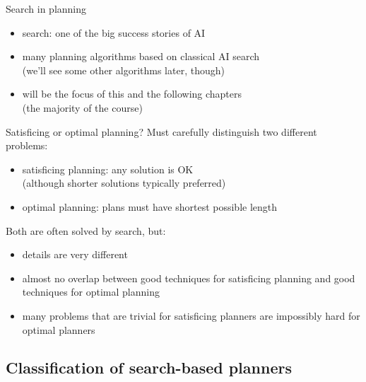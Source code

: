 \documentclass{gkibeamer}
\begin{document}
\begin{frame}{Search in planning}
  \begin{itemize}
  \item \alert{search:} one of the \alert{big success stories} of AI
  \item many planning algorithms based on classical AI search \\
    (we'll see some other algorithms later, though)
  \item will be the focus of this and the following chapters \\
    (the majority of the course)
  \end{itemize}
\end{frame}

\begin{frame}{Satisficing or optimal planning?}
  Must carefully distinguish two different problems:
  \begin{itemize}
  \item \alert{satisficing planning:} any solution is OK \\
    (although shorter solutions typically preferred)
  \item \alert{optimal planning:} plans must have shortest possible
    length
  \end{itemize}
  
  \bigskip

  Both are often solved by search, but:
  \begin{itemize}
  \item details are \alert{very different}
  \item almost \alert{no overlap} between good techniques for
    satisficing planning and good techniques for optimal planning
  \item many problems that are trivial for satisficing planners
    are impossibly hard for optimal planners
  \end{itemize}
\end{frame}

\subsection[Classification]{Classification of search-based planners}
\end{document}
